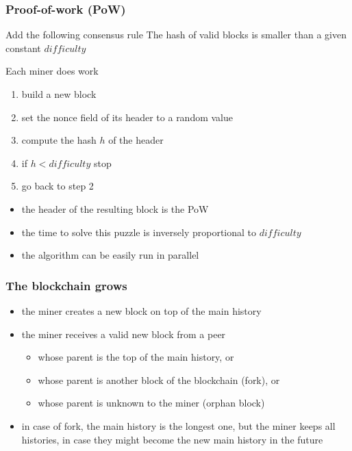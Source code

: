\documentclass[11pt]{beamer}  %
\begin{document}
\begin{frame}\frametitle{Proof-of-work (PoW)}

  \begin{greenbox}{Add the following consensus rule}
    The hash of valid blocks is smaller than
    a given constant $\mathit{difficulty}$
  \end{greenbox}

  \bigskip

  \begin{greenbox}{Each miner does work}
    \begin{enumerate}
    \item build a new block
    \item set the nonce field of its header to a random value
    \item compute the hash $h$ of the header
    \item if $h < \mathit{difficulty}$ stop
    \item go back to step 2
    \end{enumerate}
  \end{greenbox}

  \bigskip

  \begin{itemize}
  \item the header of the resulting block is the PoW
  \item the time to solve this puzzle is inversely proportional to $\mathit{difficulty}$
  \item the algorithm can be easily run in parallel
  \end{itemize}

\end{frame}

\begin{frame}\frametitle{The blockchain grows}

  \begin{itemize}
  \item the miner creates a new block on top of the main history
  \item the miner receives a valid new block from a peer
    \begin{itemize}
    \item whose parent is the top of the main history, or
    \item whose parent is another block of the blockchain (fork), or
    \item whose parent is unknown to the miner (orphan block)
    \end{itemize}
  \item in case of fork, the main history is the longest one, but the miner keeps all histories,
    in case they might become the new main history in the future
  \end{itemize}
  
\end{frame}
\end{document}
